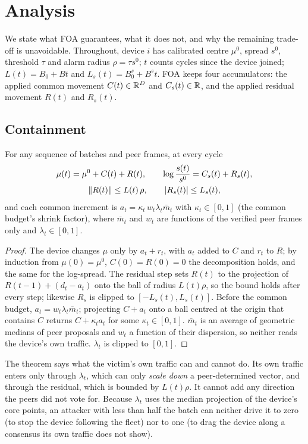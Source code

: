 \section{Analysis}\label{sec:theory}

We state what FOA guarantees, what it does not, and why the remaining trade-off is unavoidable.
Throughout, device $i$ has calibrated centre $\mu^0$, spread $s^0$, threshold $\tau$ and alarm radius
$\rho=\tau s^0$; $t$ counts cycles since the device joined; $L(t)=B_0+Bt$ and $L_s(t)=B_0^s+B^s t$.
FOA keeps four accumulators: the applied common movement $C(t)\in\mathbb{R}^D$ and $C_s(t)\in\mathbb{R}$, and the
applied residual movement $R(t)$ and $R_s(t)$.

\subsection{Containment}
\begin{theorem}\label{thm:contain}
For any sequence of batches and peer frames, at every cycle
\begin{gather}
\mu(t)=\mu^0+C(t)+R(t),\qquad \log\frac{s(t)}{s^0}=C_s(t)+R_s(t),\\
\left\lVert R(t) \right\rVert\le L(t)\,\rho,\qquad |R_s(t)|\le L_s(t),
\end{gather}
and each common increment is $a_t=\kappa_t\,w_t\lambda_t\bar m_t$ with $\kappa_t\in[0,1]$ (the common
budget's shrink factor), where $\bar m_t$ and $w_t$ are functions of the verified peer frames only and
$\lambda_t\in[0,1]$.
\end{theorem}
\begin{proof}
The device changes $\mu$ only by $a_t+r_t$, with $a_t$ added to $C$ and $r_t$ to $R$; by induction from
$\mu(0)=\mu^0$, $C(0)=R(0)=0$ the decomposition holds, and the same for the log-spread. The residual
step sets $R(t)$ to the projection of $R(t-1)+(d_t-a_t)$ onto the ball of radius $L(t)\rho$, so the
bound holds after every step; likewise $R_s$ is clipped to $[-L_s(t),L_s(t)]$. Before the common budget,
$a_t=w_t\lambda_t\bar m_t$; projecting $C+a_t$ onto a ball centred at the origin that contains $C$
returns $C+\kappa_t a_t$ for some $\kappa_t\in[0,1]$. $\bar m_t$ is an average of geometric medians of
peer proposals and $w_t$ a function of their dispersion, so neither reads the device's own traffic.
$\lambda_t$ is clipped to $[0,1]$.
\end{proof}

The theorem says what the victim's own traffic can and cannot do. Its own traffic enters only through
$\lambda_t$, which can only \emph{scale down} a peer-determined vector, and through the residual, which
is bounded by $L(t)\rho$. It cannot add any direction the peers did not vote for. Because $\lambda_t$
uses the median projection of the device's core points, an attacker with less than half the batch can
neither drive it to zero (to stop the device following the fleet) nor to one (to drag the device along a
consensus its own traffic does not show).

